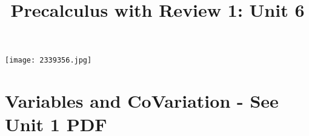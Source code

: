 \documentclass[handout]{xourse}
\title{Precalculus with Review 1: Unit 6}
\begin{document}
\texttt{[image: 2339356.jpg]}
\maketitle


	





\part{Variables and CoVariation - See Unit 1 PDF}  %
%
%
%
%
%
%
%
%
\end{document}
